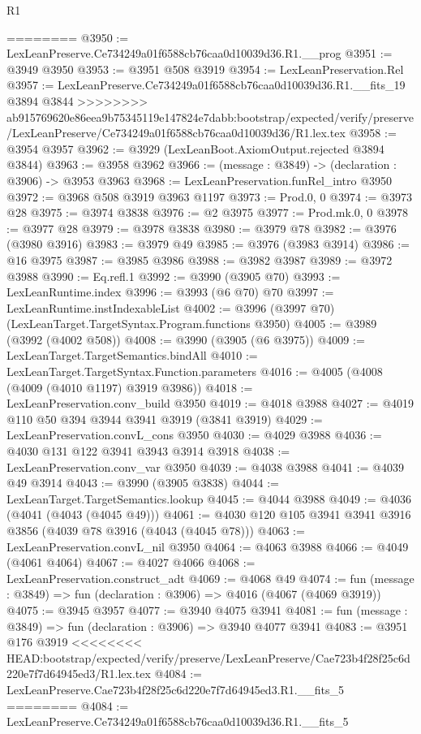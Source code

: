 \begin{lexlean}{R1}
\begin{coremodule}
{{{{{{{{{{{{{{{{{{{{{{{{{{{{{{{{{{{{{{{{{{{{{{{{{{{{{{{{{{{{{{{{{{{{{{{{{{{{{{{{{{{{{{{{{{{{{{{{{{{{{{{{{{{{{{{{{{{{{{{{{{{{{{{{{{{{{{{{{{{{{{{{{{{{{{{{{{{{{{{{{{{{{{{{{{{{{{{{{{{{{{{{{{========
@3950 := LexLeanPreserve.Ce734249a01f6588cb76caa0d10039d36.R1.__prog
@3951 := @3949 @3950
@3953 := @3951 @508 @3919
@3954 := LexLeanPreservation.Rel
@3957 := LexLeanPreserve.Ce734249a01f6588cb76caa0d10039d36.R1.__fits_19 @3894 @3844
>>>>>>>> ab915769620e86eea9b75345119e147824e7dabb:bootstrap/expected/verify/preserve/LexLeanPreserve/Ce734249a01f6588cb76caa0d10039d36/R1.lex.tex
@3958 := @3954 @3957
@3962 := @3929 (LexLeanBoot.AxiomOutput.rejected @3894 @3844)
@3963 := @3958 @3962
@3966 := (message : @3849) -> (declaration : @3906) -> @3953 @3963
@3968 := LexLeanPreservation.funRel_intro @3950
@3972 := @3968 @508 @3919 @3963 @1197
@3973 := Prod.{0, 0}
@3974 := @3973 @28
@3975 := @3974 @3838
@3976 := @2 @3975
@3977 := Prod.mk.{0, 0}
@3978 := @3977 @28
@3979 := @3978 @3838
@3980 := @3979 @78
@3982 := @3976 (@3980 @3916)
@3983 := @3979 @49
@3985 := @3976 (@3983 @3914)
@3986 := @16 @3975
@3987 := @3985 @3986
@3988 := @3982 @3987
@3989 := @3972 @3988
@3990 := Eq.refl.{1}
@3992 := @3990 (@3905 @70)
@3993 := LexLeanRuntime.index
@3996 := @3993 (@6 @70) @70
@3997 := LexLeanRuntime.instIndexableList
@4002 := @3996 (@3997 @70) (LexLeanTarget.TargetSyntax.Program.functions @3950)
@4005 := @3989 (@3992 (@4002 @508))
@4008 := @3990 (@3905 (@6 @3975))
@4009 := LexLeanTarget.TargetSemantics.bindAll
@4010 := LexLeanTarget.TargetSyntax.Function.parameters
@4016 := @4005 (@4008 (@4009 (@4010 @1197) @3919 @3986))
@4018 := LexLeanPreservation.conv_build @3950
@4019 := @4018 @3988
@4027 := @4019 @110 @50 @394 @3944 @3941 @3919 (@3841 @3919)
@4029 := LexLeanPreservation.convL_cons @3950
@4030 := @4029 @3988
@4036 := @4030 @131 @122 @3941 @3943 @3914 @3918
@4038 := LexLeanPreservation.conv_var @3950
@4039 := @4038 @3988
@4041 := @4039 @49 @3914
@4043 := @3990 (@3905 @3838)
@4044 := LexLeanTarget.TargetSemantics.lookup
@4045 := @4044 @3988
@4049 := @4036 (@4041 (@4043 (@4045 @49)))
@4061 := @4030 @120 @105 @3941 @3941 @3916 @3856 (@4039 @78 @3916 (@4043 (@4045 @78)))
@4063 := LexLeanPreservation.convL_nil @3950
@4064 := @4063 @3988
@4066 := @4049 (@4061 @4064)
@4067 := @4027 @4066
@4068 := LexLeanPreservation.construct_adt
@4069 := @4068 @49
@4074 := fun (message : @3849) => fun (declaration : @3906) => @4016 (@4067 (@4069 @3919))
@4075 := @3945 @3957
@4077 := @3940 @4075 @3941
@4081 := fun (message : @3849) => fun (declaration : @3906) => @3940 @4077 @3941
@4083 := @3951 @176 @3919
<<<<<<<< HEAD:bootstrap/expected/verify/preserve/LexLeanPreserve/Cae723b4f28f25c6d220e7f7d64945ed3/R1.lex.tex
@4084 := LexLeanPreserve.Cae723b4f28f25c6d220e7f7d64945ed3.R1.__fits_5
========
@4084 := LexLeanPreserve.Ce734249a01f6588cb76caa0d10039d36.R1.__fits_5
}}}}}}}}}}}}}}}}}}}}}}}}}}}}}}}}}}}}}}}}}}}}}}}}}}}}}}}}}}}}}}}}}}}}}}}}}}}}}}}}}}}}}}}}}}}}}}}}}}}}}}}}}}}}}}}}}}}}}}}}}}}}}}}}}}}}}}}}}}}}}}}}}}}}}}}}}}}}}}}}}}}}}}}}}}}}}}}}}}}}}}}}}}
\end{coremodule}
\end{lexlean}
